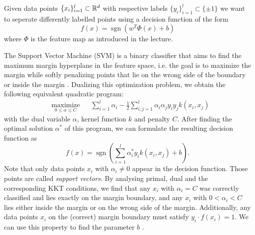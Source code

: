 Given data points $\{x_i\}_{i=1}^l \subset \mathbb{R}^d$ with respective labels $\{y_i\}_{i=1}^l \subset \{\pm 1\}$ we want to seperate differently labelled points using a decision function of the form
\begin{equation*}
f(x) = \operatorname{sgn}\left(w^T\Phi(x) + b\right)
\end{equation*}
where $\Phi$ is the feature map as introduced in the lecture.

The Support Vector Machine (SVM) is a binary classifier that aims to find the maximum margin hyperplane in the feature space, i.e. the goal is to maximize the margin while softly penalizing points that lie on the wrong side of the boundary or inside the margin \cite{Bishop2006}. Dualizing this optimization problem, we obtain the following equivalent quadratic program:
\begin{equation*}
\begin{aligned}
& \underset{0 \leq \alpha \leq C}{\text{maximize}}
& & \sum_{i = 1}^{l}\alpha_i - \frac{1}{2} \sum_{i, j = 1}^{l}\alpha_i  \alpha_j y_i y_j k(x_i, x_j)
\end{aligned}
\end{equation*}
with the dual variable $\alpha$, kernel function $k$ and penalty $C$.
After finding the optimal solution $\alpha^*$ of this program, we can formulate the resulting decision function as
\begin{equation*}
f(x) = \operatorname{sgn}\left(\sum_{i=1}^{l}\alpha^*_i y_i k(x_i,x_j)+b\right).
\end{equation*}
Note that only data points $x_i$ with $\alpha_i \neq 0$ appear in the decision function. Those points are called \textit{support vectors}. By analysing primal, dual and the corresponding KKT conditions, we find that any $x_i$ with $\alpha_i = C$ was correctly classified and lies exactly on the margin boundary, and any $x_i$ with $0<\alpha_i < C$ lies either inside the margin or on the wrong side of the margin. Additionally, any data points $x_i$ on the (correct) margin boundary must satisfy $y_i\cdot f(x_i) = 1$. We can use this property to find the parameter $b$ \cite{Bishop2006}.